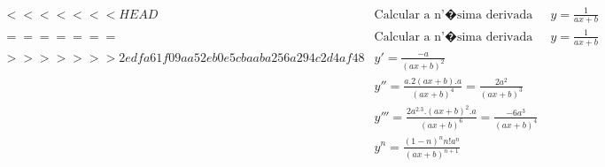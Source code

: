 \begin{ex}
\begin{align}
<<<<<<< HEAD
&\text{Calcular a n'�sima derivada de}\quad y=\frac{1}{ax+b}\nonumber\\
=======
&\text{Calcular a n'�sima derivada de}\quad y=\frac{1}{ax+b}\nonumber\\
>>>>>>> 2edfa61f09aa52eb0e5cbaaba256a294c2d4af48
&y'=\frac{-a}{(ax+b)^2}\nonumber\\
&y''=\frac{a.2(ax+b).a}{(ax+b)^4}=\frac{2a^2}{(ax+b)^3}\nonumber\\
&y'''=\frac{2a^2.3.(ax+b)^2.a}{(ax+b)^6}=\frac{-6a^3}{(ax+b)^4}\nonumber\\
&y^{n}=\frac{(1-n)^{n}n!a^{n}}{(ax+b)^{n+1}}\nonumber
\end{align}
\end{ex}
